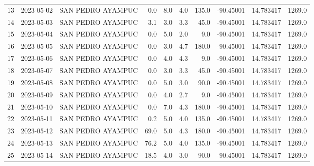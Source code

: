 \documentclass[12pt]{article}
\begin{document}
\begin{center}
\begin{tabular}{lllrrrrrrr}
13  & 2023-05-02 &  SAN PEDRO AYAMPUC &     0.0 &  8.0 &         4.0 &       135.0 & -90.45001 &  14.783417 &   1269.0 \\
14  & 2023-05-03 &  SAN PEDRO AYAMPUC &     3.1 &  3.0 &         3.3 &        45.0 & -90.45001 &  14.783417 &   1269.0 \\
15  & 2023-05-04 &  SAN PEDRO AYAMPUC &     0.0 &  5.0 &         2.0 &         9.0 & -90.45001 &  14.783417 &   1269.0 \\
16  & 2023-05-05 &  SAN PEDRO AYAMPUC &     0.0 &  3.0 &         4.7 &       180.0 & -90.45001 &  14.783417 &   1269.0 \\
17  & 2023-05-06 &  SAN PEDRO AYAMPUC &     0.0 &  4.0 &         4.3 &         9.0 & -90.45001 &  14.783417 &   1269.0 \\
18  & 2023-05-07 &  SAN PEDRO AYAMPUC &     0.0 &  3.0 &         3.3 &        45.0 & -90.45001 &  14.783417 &   1269.0 \\
19  & 2023-05-08 &  SAN PEDRO AYAMPUC &     0.0 &  5.0 &         3.0 &        90.0 & -90.45001 &  14.783417 &   1269.0 \\
20  & 2023-05-09 &  SAN PEDRO AYAMPUC &     0.0 &  4.0 &         2.7 &         9.0 & -90.45001 &  14.783417 &   1269.0 \\
21  & 2023-05-10 &  SAN PEDRO AYAMPUC &     0.0 &  7.0 &         4.3 &       180.0 & -90.45001 &  14.783417 &   1269.0 \\
22  & 2023-05-11 &  SAN PEDRO AYAMPUC &     0.2 &  5.0 &         4.0 &       135.0 & -90.45001 &  14.783417 &   1269.0 \\
23  & 2023-05-12 &  SAN PEDRO AYAMPUC &    69.0 &  5.0 &         4.3 &       180.0 & -90.45001 &  14.783417 &   1269.0 \\
24  & 2023-05-13 &  SAN PEDRO AYAMPUC &    76.2 &  5.0 &         4.0 &       135.0 & -90.45001 &  14.783417 &   1269.0 \\
25  & 2023-05-14 &  SAN PEDRO AYAMPUC &    18.5 &  4.0 &         3.0 &        90.0 & -90.45001 &  14.783417 &   1269.0 \\
\bottomrule
\end{tabular}

        
        \end{center}
        
\end{document}
